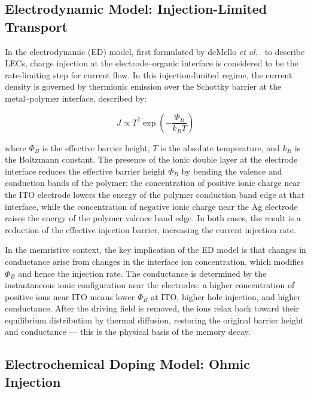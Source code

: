 \documentclass[12pt, a4paper, twoside]{report}
\begin{document}
\subsection{Electrodynamic Model: Injection-Limited Transport}\label{subsec:ed_model}

In the electrodynamic (ED) model, first formulated by deMello \textit{et al.}~\cite{deMello1998, deMello2002} to describe LECs, charge injection at the electrode--organic interface is considered to be the rate-limiting step for current flow. In this injection-limited regime, the current density is governed by thermionic emission over the Schottky barrier at the metal--polymer interface, described by:

\begin{equation}
  J \propto T^2 \exp\!\left(-\frac{\Phi_B}{k_B T}\right)
  \label{eq:thermionic}
\end{equation}

where $\Phi_B$ is the effective barrier height, $T$ is the absolute temperature, and $k_B$ is the Boltzmann constant. The presence of the ionic double layer at the electrode interface reduces the effective barrier height $\Phi_B$ by bending the valence and conduction bands of the polymer: the concentration of positive ionic charge near the ITO electrode lowers the energy of the polymer conduction band edge at that interface, while the concentration of negative ionic charge near the Ag electrode raises the energy of the polymer valence band edge. In both cases, the result is a reduction of the effective injection barrier, increasing the current injection rate.

In the memristive context, the key implication of the ED model is that changes in conductance arise from changes in the interface ion concentration, which modifies $\Phi_B$ and hence the injection rate. The conductance is determined by the instantaneous ionic configuration near the electrodes: a higher concentration of positive ions near ITO means lower $\Phi_B$ at ITO, higher hole injection, and higher conductance. After the driving field is removed, the ions relax back toward their equilibrium distribution by thermal diffusion, restoring the original barrier height and conductance — this is the physical basis of the memory decay.

\subsection{Electrochemical Doping Model: Ohmic Injection}\label{subsec:ec_model}
\end{document}
